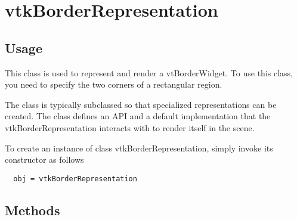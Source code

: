 \section{vtkBorderRepresentation}

\subsection{Usage}

 This class is used to represent and render a vtBorderWidget. To
 use this class, you need to specify the two corners of a rectangular
 region.

 The class is typically subclassed so that specialized representations can
 be created.  The class defines an API and a default implementation that
 the vtkBorderRepresentation interacts with to render itself in the scene.

To create an instance of class vtkBorderRepresentation, simply
invoke its constructor as follows
\begin{verbatim}
  obj = vtkBorderRepresentation
\end{verbatim}
\subsection{Methods}

